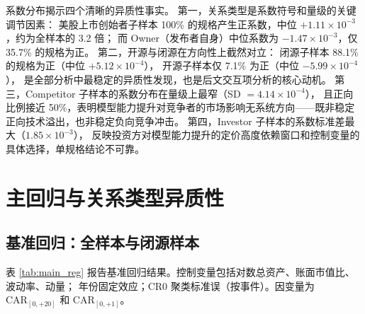 \documentclass[11pt,fontset=fandol,a4paper]{ctexart}
\begin{document}
系数分布揭示四个清晰的异质性事实。
第一，关系类型是系数符号和量级的关键调节因素：
美股上市创始者子样本 100\% 的规格产生正系数，中位 $+1.11\times10^{-3}$，约为全样本的 3.2 倍；
而 Owner（发布者自身）中位系数为 $-1.47\times10^{-3}$，仅 35.7\% 的规格为正。
第二，开源与闭源在方向性上截然对立：
闭源子样本 88.1\% 的规格为正（中位 $+5.12\times10^{-4}$），
开源子样本仅 7.1\% 为正（中位 $-5.99\times10^{-4}$），
是全部分析中最稳定的异质性发现，也是后文交互项分析的核心动机。
第三，Competitor 子样本的系数分布在量级上最窄（SD $=4.14\times10^{-4}$），
且正向比例接近 50\%，表明模型能力提升对竞争者的市场影响无系统方向——既非稳定正向技术溢出，也非稳定负向竞争冲击。
第四，Investor 子样本的系数标准差最大（$1.85\times10^{-3}$），
反映投资方对模型能力提升的定价高度依赖窗口和控制变量的具体选择，单规格结论不可靠。

\section{主回归与关系类型异质性}

\subsection{基准回归：全样本与闭源样本}

表 \ref{tab:main_reg} 报告基准回归结果。控制变量包括对数总资产、账面市值比、波动率、动量；
年份固定效应；CR0 聚类标准误（按事件）。因变量为 $\text{CAR}_{[0,+20]}$ 和 $\text{CAR}_{[0,+1]}$。
\end{document}
